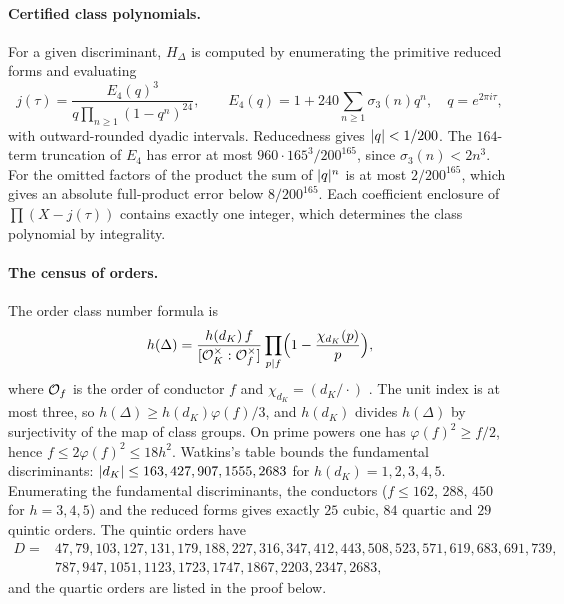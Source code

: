 \paragraph{Certified class polynomials.}
For a given discriminant, $H_\Delta$ is computed by enumerating the primitive reduced
forms and evaluating
\[
 j(\tau)=\frac{E_4(q)^3}{q\prod_{n\ge1}(1-q^n)^{24}},\qquad
 E_4(q)=1+240\sum_{n\ge1}\sigma_3(n)q^n,\quad q=e^{2\pi i\tau},
\]
with outward-rounded dyadic intervals. Reducedness gives $\lvert q\rvert<1/200$. The $164$-term
truncation of $E_4$ has error at most $960\cdot165^3/200^{165}$, since
$\sigma_3(n)<2n^3$. For the omitted factors of the product the sum of $\lvert q\rvert^n$ is at
most $2/200^{165}$, which gives an absolute full-product error below $8/200^{165}$. Each
coefficient enclosure of $\prod(X-j(\tau))$ contains exactly one integer, which determines
the class polynomial by integrality.

\paragraph{The census of orders.}
The order class number formula is
\begin{equation}\label{smd:eq:classnumber}
 h(\Delta)=\frac{h(d_K)\,f}{[\mathcal{O}_K^\times:\mathcal{O}_f^\times]}
 \prod_{p\mid f}\Bigl(1-\frac{\chi_{d_K}(p)}p\Bigr),
\end{equation}
where $\mathcal{O}_f$ is the order of conductor $f$ and $\chi_{d_K}=(d_K/\cdot)$
\cite[Theorem~7.24]{Cox2013Primes}. The unit index is at most three, so
$h(\Delta)\ge h(d_K)\varphi(f)/3$, and $h(d_K)$ divides $h(\Delta)$ by surjectivity of the
map of class groups. On prime powers one has $\varphi(f)^2\ge f/2$, hence
$f\le2\varphi(f)^2\le18h^2$. Watkins's table \cite[Table~4]{Watkins2004Class} bounds the
fundamental discriminants: $\lvert d_K\rvert\le163,427,907,1555,2683$ for
$h(d_K)=1,2,3,4,5$. Enumerating the fundamental discriminants, the conductors
($f\le162$, $288$, $450$ for $h=3,4,5$) and the reduced forms gives exactly $25$ cubic,
$84$ quartic and $29$ quintic orders. The quintic orders have
\[
\begin{aligned}
 D={}&47, 79, 103, 127, 131, 179, 188, 227, 316, 347, 412, 443, 508, 523, 571, 619, 683,
 691, 739,\\
 &787, 947, 1051, 1123, 1723, 1747, 1867, 2203, 2347, 2683,
\end{aligned}
\]
and the quartic orders are listed in the proof below.

